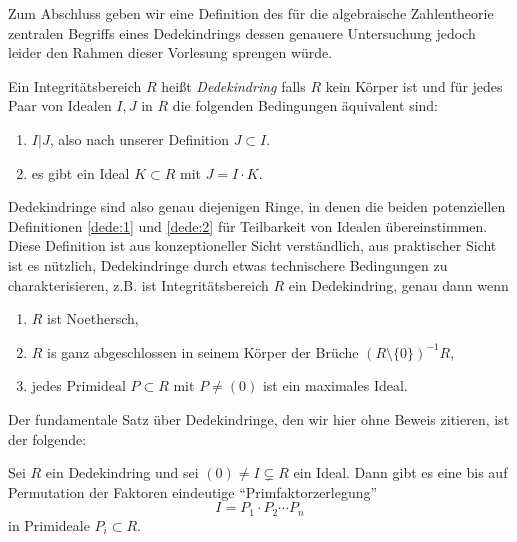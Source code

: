 \documentclass{book}
\begin{document}
Zum Abschluss geben wir eine Definition des für die algebraische Zahlentheorie
zentralen Begriffs eines Dedekindrings dessen genauere Untersuchung jedoch
leider den Rahmen dieser Vorlesung sprengen würde.

\begin{defi}
    \label{defi:dedekind}
    Ein Integritätsbereich $R$ heißt \emph{Dedekindring} falls $R$ kein Körper
    ist und für jedes Paar von Idealen $I,J$ in $R$ die folgenden Bedingungen
    äquivalent sind:
    \begin{enumerate}[label=(\roman *)]
        \item\label{dede:1} $I | J$, also nach unserer Definition $J \subset I$.
        \item\label{dede:2} es gibt ein Ideal $K \subset R$ mit $J = I \cdot K$.  
    \end{enumerate}
\end{defi}

\begin{rem}
    \label{rem:dedekind} Dedekindringe sind also genau diejenigen Ringe, in
    denen die beiden potenziellen Definitionen \eqref{dede:1} und
    \eqref{dede:2} für Teilbarkeit von Idealen übereinstimmen.
    Diese Definition ist aus konzeptioneller Sicht verständlich, aus
    praktischer Sicht ist es nützlich, Dedekindringe durch etwas technischere
    Bedingungen zu charakterisieren, z.B. ist Integritätsbereich $R$ ein Dedekindring,
    genau dann wenn
    \begin{enumerate}
        \item $R$ ist Noethersch,
        \item $R$ is ganz abgeschlossen in seinem Körper der Brüche $(R \setminus \{0\})^{-1}R$,
        \item jedes Primideal $P \subset R$ mit $P \ne (0)$ ist ein maximales Ideal.
    \end{enumerate}
\end{rem}

Der fundamentale Satz über Dedekindringe, den wir hier ohne Beweis zitieren, ist der folgende: 

\begin{thm}
    \label{thm:dedekindfaktorisierung}
    Sei $R$ ein Dedekindring und sei $(0) \ne I \subsetneq R$ ein Ideal. Dann
    gibt es eine bis auf Permutation der Faktoren eindeutige
    ``Primfaktorzerlegung''
    \[
        I = P_1 \cdot P_2 \cdots P_n
    \]
    in Primideale $P_i \subset R$.
\end{thm}
\end{document}

